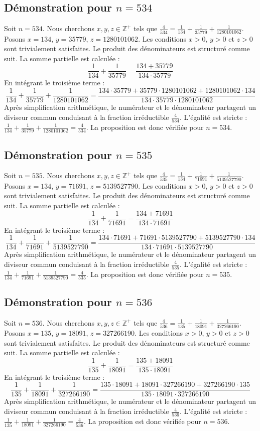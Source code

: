 \documentclass[11pt,a4paper]{article}
\begin{document}
\subsection{Démonstration pour $n = 534$}
Soit $n = 534$. Nous cherchons $x, y, z \in \mathbb{Z}^{+}$ tels que $\frac{4}{534} = \frac{1}{134} + \frac{1}{35779} + \frac{1}{1280101062}$.
Posons $x = 134$, $y = 35779$, $z = 1280101062$.
Les conditions $x > 0$, $y > 0$ et $z > 0$ sont trivialement satisfaites.
Le produit des dénominateurs est structuré comme suit. La somme partielle est calculée :
$$ \frac{1}{134} + \frac{1}{35779} = \frac{134+35779}{134 \cdot 35779} $$
En intégrant le troisième terme :
$$ \frac{1}{134} + \frac{1}{35779} + \frac{1}{1280101062} = \frac{134 \cdot 35779 + 35779 \cdot 1280101062 + 1280101062 \cdot 134}{134 \cdot 35779 \cdot 1280101062} $$
Après simplification arithmétique, le numérateur et le dénominateur partagent un diviseur commun conduisant à la fraction irréductible $\frac{4}{534}$.
L'égalité est stricte : $\frac{1}{134} + \frac{1}{35779} + \frac{1}{1280101062} = \frac{4}{534}$.
La proposition est donc vérifiée pour $n = 534$.
\subsection{Démonstration pour $n = 535$}
Soit $n = 535$. Nous cherchons $x, y, z \in \mathbb{Z}^{+}$ tels que $\frac{4}{535} = \frac{1}{134} + \frac{1}{71691} + \frac{1}{5139527790}$.
Posons $x = 134$, $y = 71691$, $z = 5139527790$.
Les conditions $x > 0$, $y > 0$ et $z > 0$ sont trivialement satisfaites.
Le produit des dénominateurs est structuré comme suit. La somme partielle est calculée :
$$ \frac{1}{134} + \frac{1}{71691} = \frac{134+71691}{134 \cdot 71691} $$
En intégrant le troisième terme :
$$ \frac{1}{134} + \frac{1}{71691} + \frac{1}{5139527790} = \frac{134 \cdot 71691 + 71691 \cdot 5139527790 + 5139527790 \cdot 134}{134 \cdot 71691 \cdot 5139527790} $$
Après simplification arithmétique, le numérateur et le dénominateur partagent un diviseur commun conduisant à la fraction irréductible $\frac{4}{535}$.
L'égalité est stricte : $\frac{1}{134} + \frac{1}{71691} + \frac{1}{5139527790} = \frac{4}{535}$.
La proposition est donc vérifiée pour $n = 535$.
\subsection{Démonstration pour $n = 536$}
Soit $n = 536$. Nous cherchons $x, y, z \in \mathbb{Z}^{+}$ tels que $\frac{4}{536} = \frac{1}{135} + \frac{1}{18091} + \frac{1}{327266190}$.
Posons $x = 135$, $y = 18091$, $z = 327266190$.
Les conditions $x > 0$, $y > 0$ et $z > 0$ sont trivialement satisfaites.
Le produit des dénominateurs est structuré comme suit. La somme partielle est calculée :
$$ \frac{1}{135} + \frac{1}{18091} = \frac{135+18091}{135 \cdot 18091} $$
En intégrant le troisième terme :
$$ \frac{1}{135} + \frac{1}{18091} + \frac{1}{327266190} = \frac{135 \cdot 18091 + 18091 \cdot 327266190 + 327266190 \cdot 135}{135 \cdot 18091 \cdot 327266190} $$
Après simplification arithmétique, le numérateur et le dénominateur partagent un diviseur commun conduisant à la fraction irréductible $\frac{4}{536}$.
L'égalité est stricte : $\frac{1}{135} + \frac{1}{18091} + \frac{1}{327266190} = \frac{4}{536}$.
La proposition est donc vérifiée pour $n = 536$.
\end{document}
